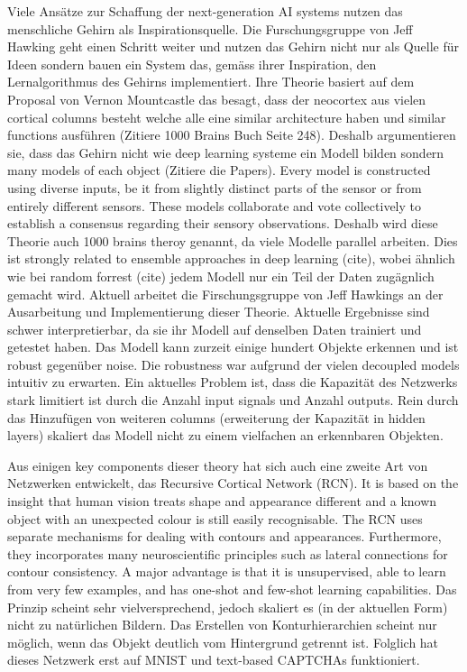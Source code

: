 Viele Ansätze zur Schaffung der next-generation AI systems nutzen das menschliche Gehirn als Inspirationsquelle. Die Furschungsgruppe von Jeff Hawking geht einen Schritt weiter und nutzen das Gehirn nicht nur als Quelle für Ideen sondern bauen ein System das, gemäss ihrer Inspiration, den Lernalgorithmus des Gehirns implementiert. Ihre Theorie basiert auf dem Proposal von Vernon Mountcastle das besagt, dass der neocortex aus vielen cortical columns besteht welche alle eine similar architecture haben und similar functions ausführen (Zitiere 1000 Brains Buch Seite 248). Deshalb argumentieren sie, dass das Gehirn nicht wie deep learning systeme ein Modell bilden sondern many models of each object (Zitiere die Papers). Every model is constructed using diverse inputs, be it from slightly distinct parts of the sensor or from entirely different sensors. These models collaborate and vote collectively to establish a consensus regarding their sensory observations. Deshalb wird diese Theorie auch 1000 brains theroy genannt, da viele Modelle parallel arbeiten. Dies ist strongly related to ensemble approaches in deep learning (cite), wobei ähnlich wie bei random forrest (cite) jedem Modell nur ein Teil der Daten zugägnlich gemacht wird. Aktuell arbeitet die Firschungsgruppe von Jeff Hawkings an der Ausarbeitung und Implementierung dieser Theorie. Aktuelle Ergebnisse sind schwer interpretierbar, da sie ihr Modell auf denselben Daten trainiert und getestet haben. Das Modell kann zurzeit einige hundert Objekte erkennen und ist robust gegenüber noise. Die robustness war aufgrund der vielen decoupled models intuitiv zu erwarten. Ein aktuelles Problem ist, dass die Kapazität des Netzwerks stark limitiert ist durch die Anzahl input signals und Anzahl outputs. Rein durch das Hinzufügen von weiteren columns (erweiterung der Kapazität in hidden layers) skaliert das Modell nicht zu einem vielfachen an erkennbaren Objekten.

Aus einigen key components dieser theory hat sich auch eine zweite Art von Netzwerken entwickelt, das Recursive Cortical Network (RCN). It is based on the insight that human vision treats shape and appearance different and a known object with an unexpected colour is still easily recognisable.
The RCN uses separate mechanisms for dealing with contours and appearances. Furthermore, they incorporates many neuroscientific principles such as lateral connections for contour consistency.
A major advantage is that it is unsupervised, able to learn from very few examples, and has one-shot and few-shot learning capabilities. Das Prinzip scheint sehr vielversprechend, jedoch skaliert es (in der aktuellen Form) nicht zu natürlichen Bildern. Das Erstellen von Konturhierarchien scheint nur möglich, wenn das Objekt deutlich vom Hintergrund getrennt ist. Folglich hat dieses Netzwerk erst auf MNIST und text-based CAPTCHAs funktioniert.

